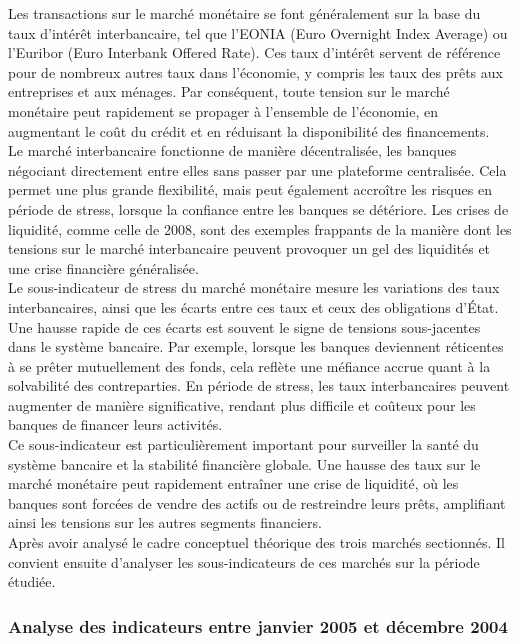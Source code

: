 \begin{sloppypar}
Les transactions sur le marché monétaire se font généralement sur la base du taux d’intérêt interbancaire, tel que l’EONIA (Euro Overnight Index Average) ou l’Euribor (Euro Interbank Offered Rate). Ces taux d'intérêt servent de référence pour de nombreux autres taux dans l'économie, y compris les taux des prêts aux entreprises et aux ménages. Par conséquent, toute tension sur le marché monétaire peut rapidement se propager à l'ensemble de l'économie, en augmentant le coût du crédit et en réduisant la disponibilité des financements.\\

Le marché interbancaire fonctionne de manière décentralisée, les banques négociant directement entre elles sans passer par une plateforme centralisée. Cela permet une plus grande flexibilité, mais peut également accroître les risques en période de stress, lorsque la confiance entre les banques se détériore. Les crises de liquidité, comme celle de 2008, sont des exemples frappants de la manière dont les tensions sur le marché interbancaire peuvent provoquer un gel des liquidités et une crise financière généralisée.\\

Le sous-indicateur de stress du marché monétaire mesure les variations des taux interbancaires, ainsi que les écarts entre ces taux et ceux des obligations d'État. Une hausse rapide de ces écarts est souvent le signe de tensions sous-jacentes dans le système bancaire. Par exemple, lorsque les banques deviennent réticentes à se prêter mutuellement des fonds, cela reflète une méfiance accrue quant à la solvabilité des contreparties. En période de stress, les taux interbancaires peuvent augmenter de manière significative, rendant plus difficile et coûteux pour les banques de financer leurs activités.\\

Ce sous-indicateur est particulièrement important pour surveiller la santé du système bancaire et la stabilité financière globale. Une hausse des taux sur le marché monétaire peut rapidement entraîner une crise de liquidité, où les banques sont forcées de vendre des actifs ou de restreindre leurs prêts, amplifiant ainsi les tensions sur les autres segments financiers.\\

Après avoir analysé le cadre conceptuel théorique des trois marchés sectionnés. Il convient ensuite d'analyser les sous-indicateurs de ces marchés sur la période étudiée.

\subsubsection{Analyse des indicateurs entre janvier 2005 et décembre 2004}


\end{sloppypar}
